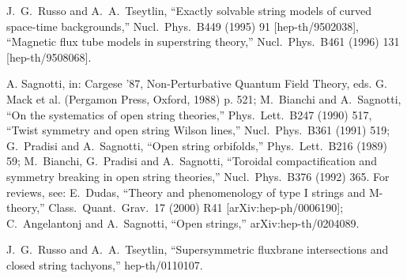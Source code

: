 \documentclass[a4paper,12pt]{article}
\begin{document}
\begin{thebibliography}{77}
J.~G.~Russo and A.~A.~Tseytlin,
``Exactly solvable string models of curved space-time backgrounds,''
Nucl.\ Phys.\ B449 (1995) 91
[hep-th/9502038],
``Magnetic flux tube models in superstring theory,''
Nucl.\ Phys.\ B461 (1996) 131
[hep-th/9508068].

 A. Sagnotti, in: Cargese '87, Non-Perturbative Quantum
Field Theory, eds. G. Mack et al. (Pergamon Press, Oxford, 1988) p. 521; 
M.~Bianchi and A.~Sagnotti,
``On the systematics of open string theories,''
Phys.\ Lett.\ B247 (1990) 517,
``Twist symmetry and open string Wilson lines,''
Nucl.\ Phys.\ B361 (1991) 519;
G.~Pradisi and A.~Sagnotti,
``Open string orbifolds,''
Phys.\ Lett.\ B216 (1989) 59;
M.~Bianchi, G.~Pradisi and A.~Sagnotti,
``Toroidal compactification and symmetry breaking in open string theories,''
Nucl.\ Phys.\ B376 (1992) 365.
For reviews, see: E.~Dudas,
``Theory and phenomenology of type I strings and M-theory,''
Class.\ Quant.\ Grav.\ 17 (2000) R41
[arXiv:hep-ph/0006190];
C.~Angelantonj and A.~Sagnotti,
``Open strings,''
arXiv:hep-th/0204089.

J.~G.~Russo and A.~A.~Tseytlin,
``Supersymmetric fluxbrane intersections and closed string tachyons,''
hep-th/0110107.

\end{thebibliography}
\end{document}
